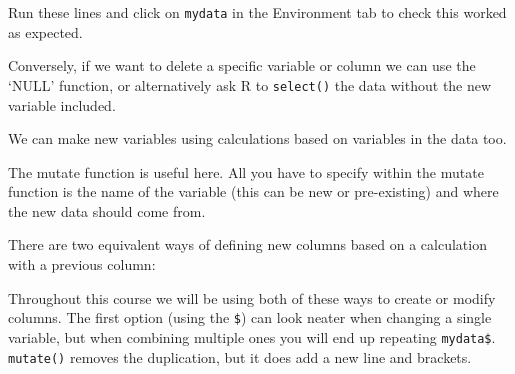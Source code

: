 \documentclass[]{book}
\makeatletter
\newenvironment{Shaded}{\begin{snugshade}}{\end{snugshade}}
\newcommand{\KeywordTok}[1]{\textcolor[rgb]{0.13,0.29,0.53}{\textbf{#1}}}
\newcommand{\DataTypeTok}[1]{\textcolor[rgb]{0.13,0.29,0.53}{#1}}
\newcommand{\DecValTok}[1]{\textcolor[rgb]{0.00,0.00,0.81}{#1}}
\newcommand{\StringTok}[1]{\textcolor[rgb]{0.31,0.60,0.02}{#1}}
\newcommand{\CommentTok}[1]{\textcolor[rgb]{0.56,0.35,0.01}{\textit{#1}}}
\newcommand{\OtherTok}[1]{\textcolor[rgb]{0.56,0.35,0.01}{#1}}
\newcommand{\OperatorTok}[1]{\textcolor[rgb]{0.81,0.36,0.00}{\textbf{#1}}}
\newcommand{\NormalTok}[1]{#1}
\newenvironment{kframe}{%
\medskip{}
\setlength{\fboxsep}{.8em}
 \def\at@end@of@kframe{}%
 \ifinner\ifhmode%
  \def\at@end@of@kframe{\end{minipage}}%
  \begin{minipage}{\columnwidth}%
 \fi\fi%
 \def\FrameCommand##1{\hskip\@totalleftmargin \hskip-\fboxsep
 \colorbox{shadecolor}{##1}\hskip-\fboxsep
     \hskip-\linewidth \hskip-\@totalleftmargin \hskip\columnwidth}%
 \MakeFramed {\advance\hsize-\width
   \@totalleftmargin\z@ \linewidth\hsize
   \@setminipage}}%
 {\par\unskip\endMakeFramed%
 \at@end@of@kframe}
\renewenvironment{Shaded}{\begin{kframe}}{\end{kframe}}
\makeatother
\begin{document}
Run these lines and click on \texttt{mydata} in the Environment tab to
check this worked as expected.

Conversely, if we want to delete a specific variable or column we can
use the `NULL' function, or alternatively ask R to \texttt{select()} the
data without the new variable included.

\begin{Shaded}
\end{Shaded}

We can make new variables using calculations based on variables in the
data too.

The mutate function is useful here. All you have to specify within the
mutate function is the name of the variable (this can be new or
pre-existing) and where the new data should come from.

There are two equivalent ways of defining new columns based on a
calculation with a previous column:

\begin{Shaded}
\end{Shaded}

Throughout this course we will be using both of these ways to create or
modify columns. The first option (using the \texttt{\$}) can look neater
when changing a single variable, but when combining multiple ones you
will end up repeating \texttt{mydata\$}. \texttt{mutate()} removes the
duplication, but it does add a new line and brackets.
\end{document}
